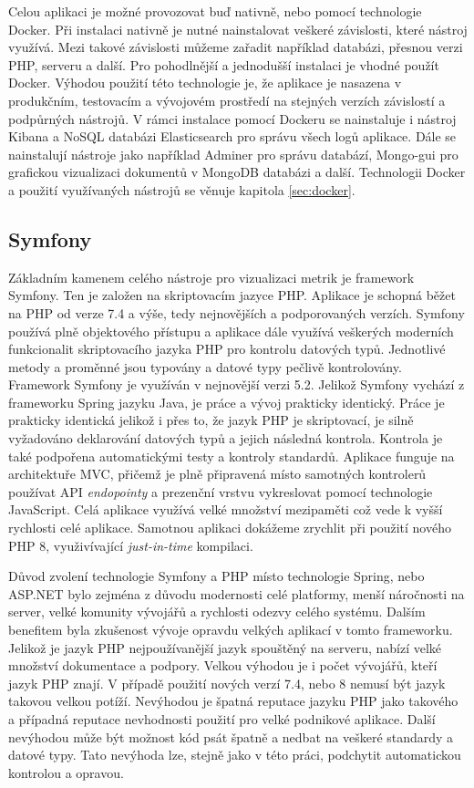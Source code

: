 \documentclass[czech,master]{diploma}
\begin{document}
Celou aplikaci je možné provozovat buď nativně, nebo pomocí technologie Docker. Při instalaci nativně je nutné nainstalovat veškeré závislosti, které nástroj využívá. Mezi takové závislosti můžeme zařadit například databázi, přesnou verzi PHP, serveru a další. Pro pohodlnější a jednodušší instalaci je vhodné použít Docker. Výhodou použití této technologie je, že aplikace je nasazena v produkčním, testovacím a vývojovém prostředí na stejných verzích závislostí a podpůrných nástrojů. V rámci instalace pomocí Dockeru se nainstaluje i nástroj Kibana a NoSQL databázi Elasticsearch pro správu všech logů aplikace. Dále se nainstalují nástroje jako například Adminer pro správu databází,  Mongo-gui pro grafickou vizualizaci dokumentů v MongoDB databázi a další. Technologii Docker a použití využívaných nástrojů se věnuje kapitola \ref{sec:docker}.

\subsection{Symfony}
\label{sec:symfony}
Základním kamenem celého nástroje pro vizualizaci metrik je framework Symfony. Ten je založen na skriptovacím jazyce PHP. Aplikace je schopná běžet na PHP od verze 7.4 a výše, tedy nejnovějších a podporovaných verzích. Symfony používá plně objektového přístupu a aplikace dále využívá veškerých moderních funkcionalit skriptovacího jazyka PHP pro kontrolu datových typů. Jednotlivé metody a proměnné jsou typovány a datové typy pečlivě kontrolovány. Framework Symfony je využíván v nejnovější verzi 5.2. Jelikož Symfony vychází z frameworku Spring jazyku Java, je práce a vývoj prakticky identický. Práce je prakticky identická jelikož i přes to, že jazyk PHP je skriptovací, je silně vyžadováno deklarování datových typů a jejich následná kontrola. Kontrola je také podpořena automatickými testy a kontroly standardů. Aplikace funguje na architektuře MVC, přičemž je plně připravená místo samotných kontrolerů používat API \textit{endopointy} a prezenční vrstvu vykreslovat pomocí technologie JavaScript. Celá aplikace využívá velké množství mezipaměti což vede k vyšší rychlosti celé aplikace. Samotnou aplikaci dokážeme zrychlit při použití nového PHP 8, využivívající \textit{just-in-time} kompilaci.

Důvod zvolení technologie Symfony a PHP místo technologie Spring, nebo ASP.NET bylo zejména z důvodu modernosti celé platformy, menší náročnosti na server, velké komunity vývojářů a rychlosti odezvy celého systému. Dalším benefitem byla zkušenost vývoje opravdu velkých aplikací v tomto frameworku. Jelikož je jazyk PHP nejpoužívanější jazyk spouštěný na serveru, nabízí velké množství dokumentace a podpory. \cite{ref:php_trend} Velkou výhodou je i počet vývojářů, kteří jazyk PHP znají.  V případě použití nových verzí 7.4, nebo 8 nemusí být jazyk takovou velkou potíží. Nevýhodou je špatná reputace jazyku PHP jako takového a případná reputace nevhodnosti použití pro velké podnikové aplikace. Další nevýhodou může být možnost kód psát špatně a nedbat na veškeré standardy a datové typy. Tato nevýhoda lze, stejně jako v této práci, podchytit automatickou kontrolou a opravou.
\end{document}
